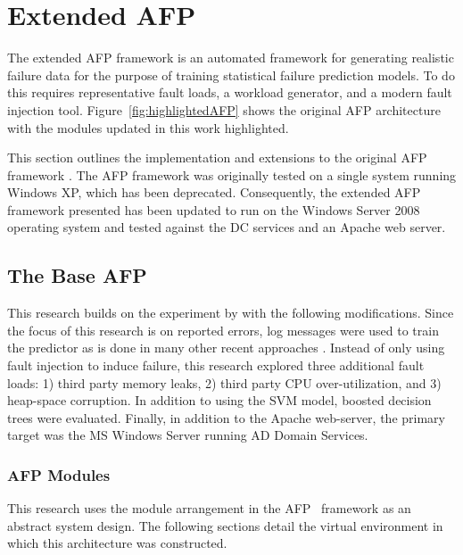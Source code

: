 \section{Extended \acrfull{AFP}} \label{chapter3}
The extended \ac{AFP} framework is an automated framework for generating
realistic failure data for the purpose of training statistical failure
prediction models.  To do this requires representative fault loads, a workload
generator, and a modern fault injection tool.  Figure~\ref{fig:highlightedAFP}
shows the original \ac{AFP} architecture with the modules updated in this work
highlighted.

This section outlines the implementation and extensions to the original
\ac{AFP} framework \citep{irrera2015}.  The \ac{AFP} framework was originally
tested on a single system running Windows XP, which has been deprecated.
Consequently, the extended \ac{AFP} framework presented has been updated to run
on the Windows Server 2008 operating system and tested against the \ac{DC}
services and an Apache web server.

\subsection{The Base \acrfull{AFP}} \label{sec:implementation}
This research builds on the experiment by \citet{irrera2015} with the following
modifications.  Since the focus of this research is on reported errors, log
messages were used to train the predictor as is done in many other recent
approaches \citep{domeniconi2002,fulp2008,salfner2007,watanabe2014}.  Instead
of only using fault injection to induce failure, this research explored three
additional fault loads: 1) third party memory leaks, 2) third party \ac{CPU}
over-utilization, and 3) heap-space corruption.  In addition to using the
\ac{SVM} model, boosted decision trees were evaluated.  Finally, in addition to
the Apache web-server, the primary target was the \ac{MS} Windows Server
running \ac{AD} Domain Services.

\subsubsection{\acrfull{AFP} Modules}
This research uses the module arrangement in the \ac{AFP}~\citep{irrera2015}
framework as an abstract system design.  The following sections detail the
virtual environment in which this architecture was constructed.


